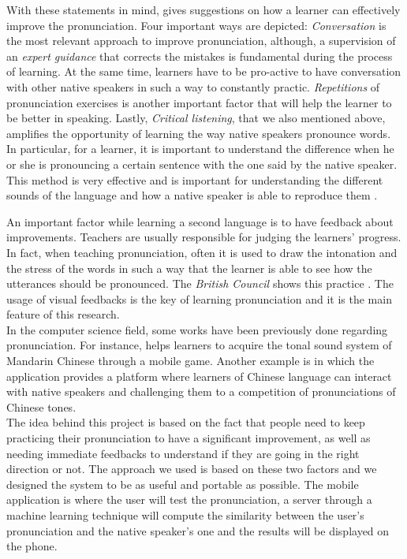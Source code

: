 \noindent With these statements in mind, \cite{gilakjani2011pronunciation} gives suggestions on how a learner can effectively improve the pronunciation. Four important ways are depicted: \textit{Conversation} is the most relevant approach to improve pronunciation, although, a supervision of an \textit{expert guidance} that corrects the mistakes is fundamental during the process of learning. At the same time, learners have to be pro-active to have conversation with other native speakers in such a way to constantly practic. \textit{Repetitions} of pronunciation exercises is another important factor that will help the learner to be better in speaking. Lastly, \textit{Critical listening}, that we also mentioned above, amplifies the opportunity of learning the way native speakers pronounce words. In particular, for a learner, it is important to understand the difference when he or she is pronouncing a certain sentence with the one said by the native speaker. This method is very effective and is important for understanding the different sounds of the language and how a native speaker is able to reproduce them \cite{rost2014listening}.

\noindent An important factor while learning a second language is to have feedback about improvements. Teachers are usually responsible for judging the learners' progress. In fact, when teaching pronunciation, often it is used to draw the intonation and the stress of the words in such a way that the learner is able to see how the utterances should be pronounced. The \textit{British Council} shows this practice \cite{bbc_stress}. The usage of visual feedbacks is the key of learning pronunciation and it is the main feature of this research. \\

\noindent In the computer science field, some works have been previously done regarding pronunciation. For instance, \cite{edge2012tip} helps learners to acquire the tonal sound system of Mandarin Chinese through a mobile game. Another example is \cite{head2014tonewars} in which the application provides a platform where learners of Chinese language can interact with native speakers and challenging them to a competition of pronunciations of Chinese tones. \\

\noindent The idea behind this project is based on the fact that people need to keep practicing their pronunciation to have a significant improvement, as well as needing immediate feedbacks to understand if they are going in the right direction or not. The approach we used is based on these two factors and we designed the system to be as useful and portable as possible. The mobile application is where the user will test the pronunciation, a server through a machine learning technique will compute the similarity between the user's pronunciation and the native speaker's one and the results will be displayed on the phone. \\

